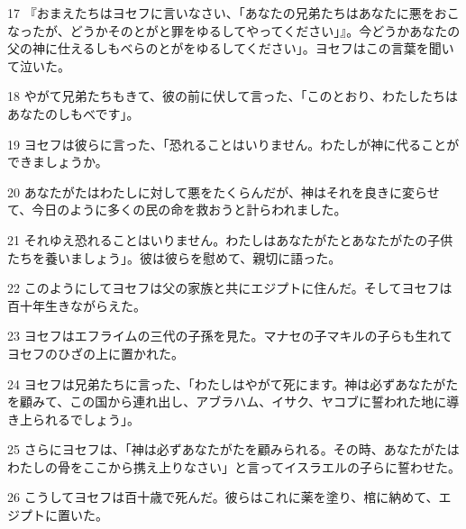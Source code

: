 \par 17 『おまえたちはヨセフに言いなさい、「あなたの兄弟たちはあなたに悪をおこなったが、どうかそのとがと罪をゆるしてやってください」』。今どうかあなたの父の神に仕えるしもべらのとがをゆるしてください」。ヨセフはこの言葉を聞いて泣いた。
\par 18 やがて兄弟たちもきて、彼の前に伏して言った、「このとおり、わたしたちはあなたのしもべです」。
\par 19 ヨセフは彼らに言った、「恐れることはいりません。わたしが神に代ることができましょうか。
\par 20 あなたがたはわたしに対して悪をたくらんだが、神はそれを良きに変らせて、今日のように多くの民の命を救おうと計らわれました。
\par 21 それゆえ恐れることはいりません。わたしはあなたがたとあなたがたの子供たちを養いましょう」。彼は彼らを慰めて、親切に語った。
\par 22 このようにしてヨセフは父の家族と共にエジプトに住んだ。そしてヨセフは百十年生きながらえた。
\par 23 ヨセフはエフライムの三代の子孫を見た。マナセの子マキルの子らも生れてヨセフのひざの上に置かれた。
\par 24 ヨセフは兄弟たちに言った、「わたしはやがて死にます。神は必ずあなたがたを顧みて、この国から連れ出し、アブラハム、イサク、ヤコブに誓われた地に導き上られるでしょう」。
\par 25 さらにヨセフは、「神は必ずあなたがたを顧みられる。その時、あなたがたはわたしの骨をここから携え上りなさい」と言ってイスラエルの子らに誓わせた。
\par 26 こうしてヨセフは百十歳で死んだ。彼らはこれに薬を塗り、棺に納めて、エジプトに置いた。


